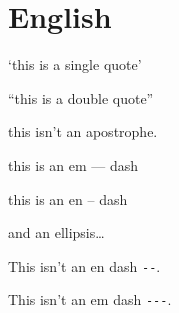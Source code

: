 
\def\mytitle{MultiMarkdown English Test}


\part{English}
\label{english}

`this is a single quote'

``this is a double quote''

this isn't an apostrophe.

this is an em --- dash

this is an en -- dash

and an ellipsis{\ldots}

This isn't an en dash \texttt{-{}-}.

This isn't an em dash \texttt{-{}-{}-}.




